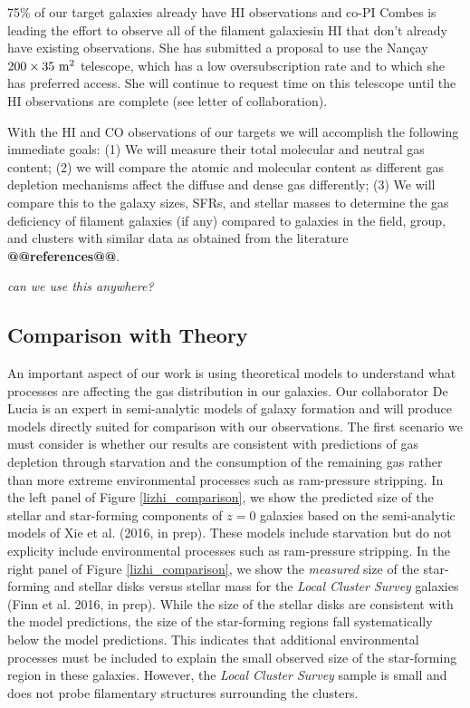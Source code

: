 \documentclass[11pt, preprint]{aastex}
\begin{document}
{75\% of our target galaxies already have HI observations and co-PI Combes is leading the effort to observe all of the filament galaxiesin HI that don't already have existing observations.  She has submitted a proposal to use the Nan\c{c}ay $\rm 200 \times 35~m^2$ telescope, which has a low oversubscription rate and to which she has preferred access.  She will continue to request time on this telescope until the HI observations are complete (see letter of collaboration).

With the HI and CO observations of our targets we will accomplish the following immediate goals: 
(1) We will measure their total molecular and neutral gas content; (2) we will compare the atomic and molecular content as different gas depletion mechanisms affect the diffuse and dense gas differently; (3) We will compare this to the galaxy sizes, SFRs, and stellar masses to determine the gas deficiency of filament galaxies (if any) compared to galaxies in the field, group, and clusters with similar data as obtained from the literature \textbf{@@references@@}.



{\it can we use this anywhere?} 

\vspace*{-1cm}
\subsection{Comparison with Theory}
\vspace*{-.4cm}

An important aspect of our work is using theoretical models to understand what processes are affecting the gas distribution in our galaxies.  Our collaborator De Lucia is an expert in semi-analytic models of galaxy formation and will produce models directly suited for comparison with our observations.  The first scenario we must consider is whether our results are
consistent with predictions of gas depletion through starvation and
the consumption of the remaining gas
rather than more extreme environmental processes such as ram-pressure stripping.
In the left panel of Figure \ref{lizhi_comparison}, we show the predicted size of the
stellar and star-forming components of $z = 0$ galaxies based on the
semi-analytic models of Xie et al. (2016, in prep).  These models
include starvation but do not explicity include environmental
processes such as ram-pressure stripping.  In the right panel of
Figure \ref{lizhi_comparison}, we show the {\it measured} size of the
star-forming and stellar disks versus stellar mass for the {\it Local
  Cluster Survey} galaxies (Finn et al. 2016, in prep).  While the size of the stellar disks are
consistent with the model predictions, the size of the star-forming
regions fall systematically below the model predictions.  This
indicates that additional environmental processes must be included to
explain the small observed size of the star-forming region in these
galaxies.  However, the {\it Local Cluster Survey} sample is small and does not probe filamentary structures surrounding the clusters.


}
\end{document}
